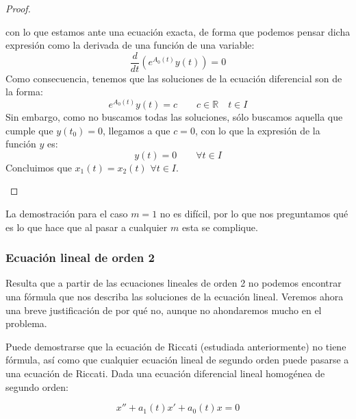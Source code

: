 \begin{prop}
\begin{proof}
\begin{description}
                con lo que estamos ante una ecuación exacta, de forma que podemos pensar dicha expresión como la derivada de una función de una variable:
                \begin{equation*}
                    \dfrac{d}{dt}\left(e^{A_0(t)}y(t)\right) = 0
                \end{equation*}
                Como consecuencia, tenemos que las soluciones de la ecuación diferencial son de la forma:
                \begin{equation*}
                    e^{A_0(t)} y(t) = c \qquad c\in \mathbb{R} \quad t\in I
                \end{equation*}
                Sin embargo, como no buscamos todas las soluciones, sólo buscamos aquella que cumple que $y(t_0) = 0$, llegamos a que $c = 0$, con lo que la expresión de la función $y$ es:
                \begin{equation*}
                    y(t) = 0 \qquad \forall t\in I
                \end{equation*}
                Concluimos que $x_1(t) = x_2(t)$ $\forall t\in I$.
        \end{description}
    \end{proof}
\end{prop}

La demostración para el caso $m=1$ no es difícil, por lo que nos preguntamos qué es lo que hace que al pasar a cualquier $m$ esta se complique.

\subsubsection{Ecuación lineal de orden 2}
Resulta que a partir de las ecuaciones lineales de orden 2 no podemos encontrar una fórmula que nos describa las soluciones de la ecuación lineal. Veremos ahora una breve justificación de por qué no, aunque no ahondaremos mucho en el problema.

Puede demostrarse que la ecuación de Riccati (estudiada anteriormente) no tiene fórmula, así como que cualquier ecuación lineal de segundo orden puede pasarse a una ecuación de Riccati. Dada una ecuación diferencial lineal homogénea de segundo orden:

\begin{equation*}
    x'' + a_1(t) x' + a_0(t) x = 0
\end{equation*}


